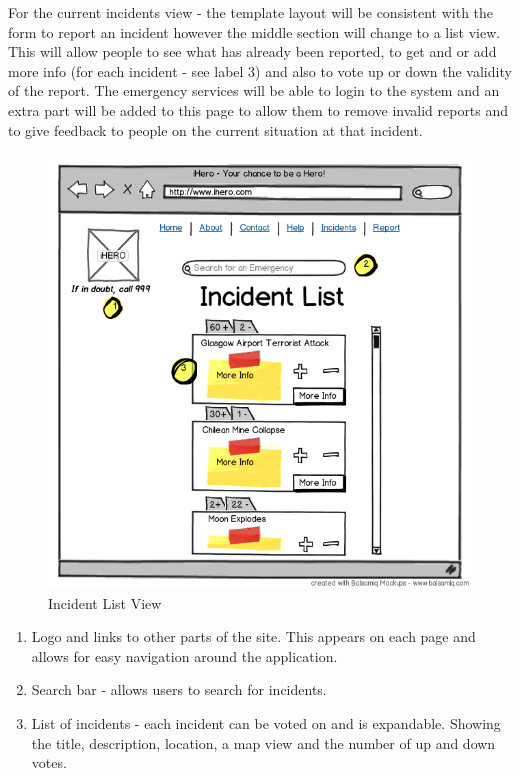 \documentclass{sig-alt-release2}
\begin{document}
For the current incidents view - the template layout will be consistent with the form to report an incident however the middle section will change to a list view. This will allow people to see what has already been reported, to get and or add more info (for each incident - see label 3) and also to vote up or down the validity of the report.
The emergency services will be able to login to the system and an extra part will be added to this page to allow them to remove invalid reports and to give feedback to people on the current situation at that incident.

\begin{figure}
  \caption{Incident List View}
  \begin{center}
    \includegraphics[scale=0.4]{img/5.png}
  \end{center}
\end{figure}

\begin{enumerate}
  \item Logo and links to other parts of the site. This appears on each page and allows for easy navigation around the application.
  \item Search bar - allows users to search for incidents.
    \item List of incidents - each incident can be voted on and is expandable. Showing the title, description, location, a map view and the number of up and down votes.
\end{enumerate}
\end{document}
